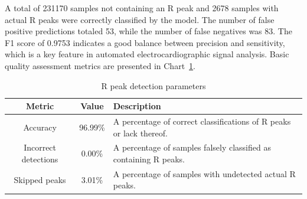 \documentclass[journal]{IEEEtran}
\begin{document}
A total of 231170 samples not containing an R peak and 2678 samples with actual R peaks were correctly classified by the model. The number of false positive predictions totaled 53, while the number of false negatives was 83. The F1 score of 0.9753 indicates a good balance between precision and sensitivity, which is a key feature in automated electrocardiographic signal analysis. Basic quality assessment metrics are presented in Chart~\ref{tab:metrics}.

\begin{table}[ht]
\centering
\caption{R peak detection parameters}
\label{tab:metrics}
\begin{tabular}{|c|c|p{4.6cm}|}
\hline
\textbf{Metric} & \textbf{Value} & \textbf{Description} \\
\hline
Accuracy & 96.99\% & A percentage of correct classifications of R peaks or lack thereof. \\
Incorrect detections & 0.00\% & A percentage of samples falsely classified as containing R peaks. \\
Skipped peaks & 3.01\% & A percentage of samples with undetected actual R peaks. \\
\hline
\end{tabular}
\end{table}

\end{document}
